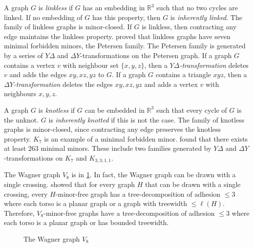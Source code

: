 A graph $G$ is \textit{linkless} if $G$ has an embedding in $\mathbb{R}^3$ such that no two cycles are linked. If no embedding of $G$ has this property, then $G$ is \textit{inherently linked}. The family of linkless graphs is minor-closed. If $G$ is linkless, then contracting any edge maintains the linkless property. \textcite{robertsonSachsLinklessEmbedding1995} proved that linkless graphs have seven minimal forbidden minors, the Petersen family. The Petersen family is generated by a series of $Y \Delta$ and $\Delta Y$-transformations on the Petersen graph. If a graph $G$ contains a vertex $v$ with neighbour set $\{x,y,z\}$, then a \textit{$Y \Delta$-transformation} deletes $v$ and adds the edges $xy,xz, yz$ to $G$. If a graph $G$ contains a triangle $xyz$, then a \textit{$\Delta Y$-transformation} deletes the edges $xy, xz, yz$ and adds a vertex $v$ with neighbours $x, y, z$. 

A graph $G$ is \textit{knotless} if $G$ can be embedded in $\mathbb{R}^3$ such that every cycle of $G$ is the unknot. $G$ is \textit{inherently knotted} if this is not the case. The family of knotless graphs is minor-closed, since contracting any edge preserves the knotless property. $K_7$ is an example of a minimal forbidden minor. \textcite{goldbergManyManyMore2014} found that there exists at least 263 minimal minors. These include two families generated by $Y \Delta$ and $\Delta Y$-transformations on $K_7$ and $K_{3,3,1,1}$. 



The Wagner graph $V_8$ is in \cref{fig:wagner}. In fact, the Wagner graph can be drawn with a single crossing. \textcite{robertsonExcludingGraphOne1993} showed that for every graph $H$ that can be drawn with a single crossing, every $H$-minor-free graph has a tree-decomposition of adhesion $\leq 3$ where each torso is a planar graph or a graph with treewidth $\leq \ell(H)$. Therefore, $V_8$-minor-free graphs have a tree-decomposition of adhesion $\leq 3$ where each torso is a planar graph or has bounded treewidth. 
\begin{figure}[h!]
	\centering
	\begin{tikzpicture}[thick,scale=1.5, every node/.style={scale=2}]
		
	\end{tikzpicture}
	\caption[Wagner graph]{The Wagner graph $V_8$}\label{fig:wagner}
\end{figure}